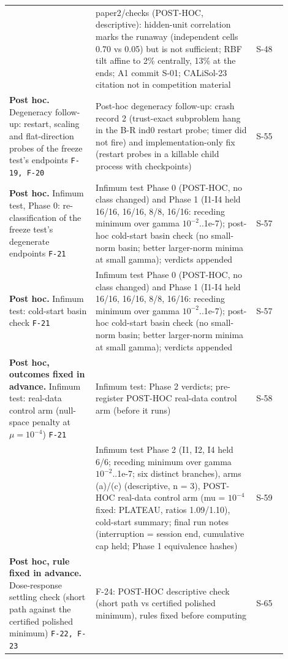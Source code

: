 {\begin{longtable}{R{0.28\linewidth} R{0.52\linewidth} R{0.10\linewidth}}
 & paper2/checks (POST-HOC, descriptive): hidden-unit correlation marks the runaway (independent cells 0.70 vs 0.05) but is not sufficient; RBF tilt affine to 2\% centrally, 13\% at the ends; A1 commit S-01; CALiSol-23 citation not in competition material & S-48 \\
\textbf{Post hoc.} Degeneracy follow-up: restart, scaling and flat-direction probes of the freeze test's endpoints \newline \footnotesize{\texttt{F-19, F-20}} & Post-hoc degeneracy follow-up: crash record 2 (trust-exact subproblem hang in the B-R ind0 restart probe; timer did not fire) and implementation-only fix (restart probes in a killable child process with checkpoints) & S-55 \\
\textbf{Post hoc.} Infimum test, Phase 0: re-classification of the freeze test's degenerate endpoints \newline \footnotesize{\texttt{F-21}} & Infimum test Phase 0 (POST-HOC, no class changed) and Phase 1 (I1-I4 held 16/16, 16/16, 8/8, 16/16: receding minimum over gamma $10^{-2}$..1e-7); post-hoc cold-start basin check (no small-norm basin; better larger-norm minima at small gamma); verdicts appended & S-57 \\
\textbf{Post hoc.} Infimum test: cold-start basin check \newline \footnotesize{\texttt{F-21}} & Infimum test Phase 0 (POST-HOC, no class changed) and Phase 1 (I1-I4 held 16/16, 16/16, 8/8, 16/16: receding minimum over gamma $10^{-2}$..1e-7); post-hoc cold-start basin check (no small-norm basin; better larger-norm minima at small gamma); verdicts appended & S-57 \\
\textbf{Post hoc, outcomes fixed in advance.} Infimum test: real-data control arm (null-space penalty at $\mu = 10^{-4}$) \newline \footnotesize{\texttt{F-21}} & Infimum test: Phase 2 verdicts; pre-register POST-HOC real-data control arm (before it runs) & S-58 \\
 & Infimum test Phase 2 (I1, I2, I4 held 6/6; receding minimum over gamma $10^{-2}$..1e-7; six distinct branches), arms (a)/(c) (descriptive, n = 3), POST-HOC real-data control arm (mu = $10^{-4}$ fixed: PLATEAU, ratios 1.09/1.10), cold-start summary; final run notes (interruption = session end, cumulative cap held; Phase 1 equivalence hashes) & S-59 \\
\textbf{Post hoc, rule fixed in advance.} Dose-response settling check (short path against the certified polished minimum) \newline \footnotesize{\texttt{F-22, F-23}} & F-24: POST-HOC descriptive check (short path vs certified polished minimum), rules fixed before computing & S-65 \\

\end{longtable}}
